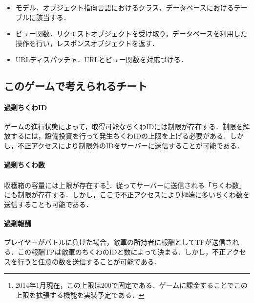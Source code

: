 \begin{itemize}
\item
モデル．オブジェクト指向言語におけるクラス，データベースにおけるテーブルに該当する．
\item
ビュー関数．リクエストオブジェクトを受け取り，データベースを利用した操作を行い，レスポンスオブジェクトを返す．
\item
URLディスパッチャ．URLとビュー関数を対応づける．
\end{itemize}

\subsection{このゲームで考えられるチート}
\paragraph{過剰ちくわID}
ゲームの進行状態によって，取得可能なちくわIDには制限が存在する．制限を解放するには，設備投資を行って発生ちくわIDの上限を上げる必要がある．しかし，不正アクセスにより制限外のIDをサーバーに送信することが可能である．

\paragraph{過剰ちくわ数}
収穫箱の容量には上限が存在する\footnote{2014年1月現在，この上限は200で固定である．ゲームに課金することでこの上限を拡張する機能を実装予定である．}．従ってサーバーに送信される「ちくわ数」にも制限が存在する．しかし，ここで不正アクセスにより極端に多いちくわ数を送信することも可能である．

\paragraph{過剰報酬}
プレイヤーがバトルに負けた場合，敵軍の所持者に報酬としてTPが送信される．この報酬TPは敵軍のちくわのIDと数によって決まる．しかし，不正アクセスを行うと任意の数を送信することが可能である．

